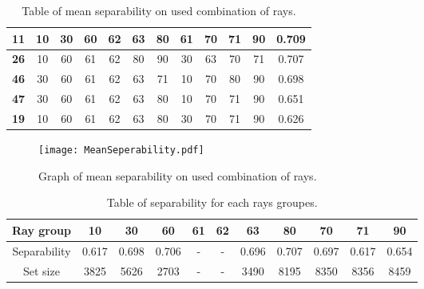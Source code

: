 \begin{table}
\begin{tabular}{|c|c|c|c|c|c|c|c|c|c|c|c|}
\hline
\textbf{11} & 10 & 30 & 60 & 62 & 63 & 80 & 61 & 70 & 71 & 90 & 0.709 \\
\hline
\textbf{26} & 10 & 60 & 61 & 62 & 80 & 90 & 30 & 63 & 70 & 71 & 0.707 \\
\hline
\textbf{46} & 30 & 60 & 61 & 62 & 63 & 71 & 10 & 70 & 80 & 90 & 0.698 \\
\hline
\textbf{47} & 30 & 60 & 61 & 62 & 63 & 80 & 10 & 70 & 71 & 90 & 0.651 \\
\hline
\textbf{19} & 10 & 60 & 61 & 62 & 63 & 80 & 30 & 70 & 71 & 90 & 0.626 \\
\hline
\end{tabular}
\caption{Table of mean separability on used combination of rays.}
\label{table:MeanSeperability}
\end{table}

\newpage

\begin{figure}[htp]
\centering
\texttt{[image: MeanSeperability.pdf]}
\caption{Graph of mean separability on used combination of rays.}
\end{figure}


\begin{table} [htp]
\centering
\begin{tabular}{|c|c|c|c|c|c|c|c|c|c|c|}
\hline 
 Ray group & 10 & 30 & 60 & 61 & 62 & 63 & 80  & 70 & 71 & 90\\
\hline
Separability & 0.617 & 0.698 & 0.706 & - & - & 0.696 & 0.707 & 0.697 & 0.617 & 0.654 \\
\hline
Set size &3825 & 5626 & 2703 & - & - & 3490 & 8195 & 8350 & 8356 & 8459 \\
\hline
\end{tabular}
\caption{Table of separability for each rays groupes.}
\label{table:GroupSeperability}
\end{table}

